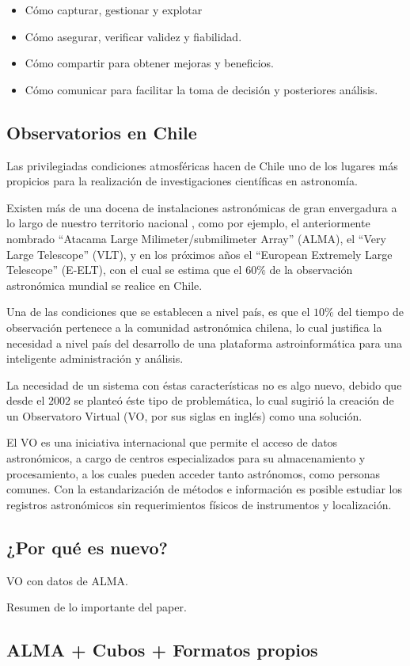 \begin{itemize}
    \item Cómo capturar, gestionar y explotar
    \item Cómo asegurar, verificar validez y fiabilidad.
    \item Cómo compartir para obtener mejoras y beneficios.
    \item Cómo comunicar para facilitar la toma de decisión y posteriores análisis.
\end{itemize}

\subsection{Observatorios en Chile}

Las privilegiadas condiciones atmosféricas hacen de Chile uno de los lugares más
propicios para la realización de investigaciones científicas en astronomía.

Existen más de una docena de instalaciones astronómicas de gran envergadura a lo
largo de nuestro territorio nacional \cite{observatorios_chile}, como por ejemplo,
el anteriormente nombrado ``Atacama Large Milimeter/submilimeter Array'' (ALMA),
el ``Very Large Telescope'' (VLT), y en los próximos años el ``European Extremely
Large Telescope'' (E-ELT), con el cual se estima que el $60\%$ de la observación
astronómica mundial se realice en Chile.

Una de las condiciones que se establecen a nivel país, es que el $10\%$ del tiempo
de observación pertenece a la comunidad astronómica chilena, lo cual justifica
la necesidad a nivel país del desarrollo de una plataforma astroinformática
para una inteligente administración y análisis.

La necesidad de un sistema con éstas características no es algo nuevo,
debido que desde el $2002$ se planteó éste tipo de problemática, lo cual sugirió
la creación de un Observatoro Virtual (VO, por sus siglas en inglés) como una solución.

El VO es una iniciativa internacional que permite el acceso de datos astronómicos,
a cargo de centros especializados para su almacenamiento y procesamiento,
a los cuales pueden acceder tanto astrónomos, como personas comunes.
Con la estandarización de métodos e información es posible estudiar los registros
astronómicos sin requerimientos físicos de instrumentos y localización.

\subsection{¿Por qué es nuevo?}
VO con datos de ALMA.

Resumen de lo importante del paper.



\subsection{ALMA + Cubos + Formatos propios}
